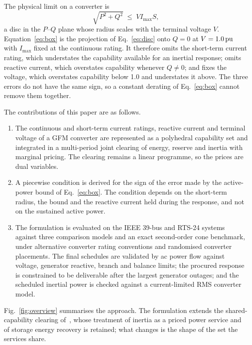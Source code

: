 The physical limit on a converter is
%
\begin{equation}
  \sqrt{P^2 + Q^2} \;\le\; V I_{\max} S ,
  \label{eq:disc}
\end{equation}
%
a disc in the $P$--$Q$ plane whose radius scales with the terminal voltage
$V$. Equation~\eqref{eq:box} is the projection of Eq.~\eqref{eq:disc} onto
$Q = 0$ at $V = \SI{1.0}{\ensuremath{\mathrm{pu}}}$ with $I_{\max}$ fixed at the continuous rating.
It therefore omits the short-term current rating, which understates the
capability available for an inertial response; omits reactive current, which
overstates capability whenever $Q \neq 0$; and fixes the voltage, which
overstates capability below \SI{1.0}{\pu} and understates it above. The three
errors do not have the same sign, so a constant derating of
Eq.~\eqref{eq:box} cannot remove them together.

The contributions of this paper are as follows.
\begin{enumerate}
  \item The continuous and short-term current ratings, reactive current and
        terminal voltage of a GFM converter are represented as a polyhedral
        capability set and integrated in a multi-period joint clearing of
        energy, reserve and inertia with marginal pricing. The clearing
        remains a linear programme, so the prices are dual variables.
  \item A piecewise condition is derived for the sign of the error made by
        the active-power bound of Eq.~\eqref{eq:box}. The condition depends
        on the short-term radius, the bound and the reactive current held
        during the response, and not on the sustained active power.
  \item The formulation is evaluated on the IEEE 39-bus and RTS-24 systems
        against three comparison models and an exact second-order cone
        benchmark, under alternative converter rating conventions and
        randomised converter placements. The final schedules are validated
        by ac power flow against voltage, generator reactive, branch and
        balance limits; the procured response is constrained to be
        deliverable after the largest generator outages; and the scheduled
        inertial power is checked against a current-limited RMS converter
        model.
\end{enumerate}

Fig.~\ref{fig:overview} summarises the approach. The formulation extends the
shared-capability clearing of~\cite{park2026inertia}, whose treatment of
inertia as a priced power service and of storage energy recovery is retained;
what changes is the shape of the set the services share.

